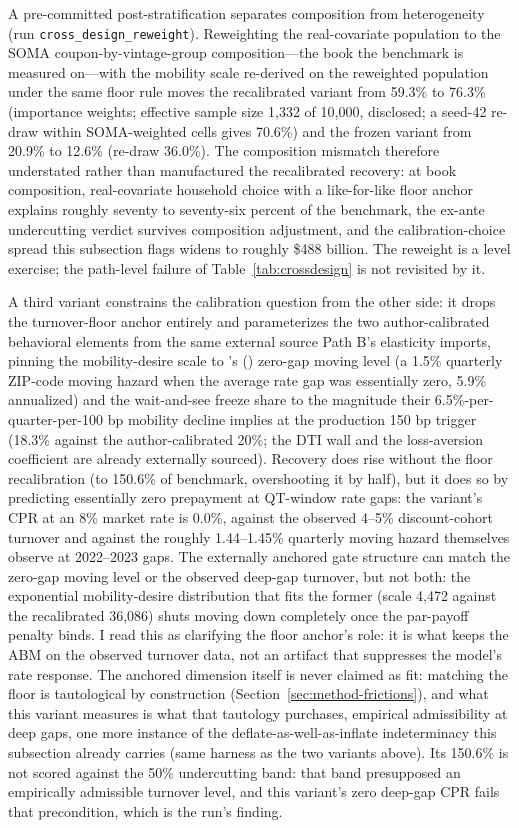 \documentclass[12pt]{article}
\newcommand{\citepos}[1]{\citeauthor{#1}'s (\citeyear{#1})}
\begin{document}
A pre-committed post-stratification separates composition from heterogeneity (run \texttt{cross\_design\_reweight}). Reweighting the real-covariate population to the SOMA coupon-by-vintage-group composition---the book the benchmark is measured on---with the mobility scale re-derived on the reweighted population under the same floor rule moves the recalibrated variant from 59.3\% to 76.3\% (importance weights; effective sample size 1{,}332 of 10{,}000, disclosed; a seed-42 re-draw within SOMA-weighted cells gives 70.6\%) and the frozen variant from 20.9\% to 12.6\% (re-draw 36.0\%). The composition mismatch therefore understated rather than manufactured the recalibrated recovery: at book composition, real-covariate household choice with a like-for-like floor anchor explains roughly seventy to seventy-six percent of the benchmark, the ex-ante undercutting verdict survives composition adjustment, and the calibration-choice spread this subsection flags widens to roughly \$488 billion. The reweight is a level exercise; the path-level failure of Table~\ref{tab:crossdesign} is not revisited by it.

A third variant constrains the calibration question from the other side: it drops the turnover-floor anchor entirely and parameterizes the two author-calibrated behavioral elements from the same external source Path B's elasticity imports, pinning the mobility-desire scale to \citepos{liebersohn2024} zero-gap moving level (a 1.5\% quarterly ZIP-code moving hazard when the average rate gap was essentially zero, 5.9\% annualized) and the wait-and-see freeze share to the magnitude their 6.5\%-per-quarter-per-100 bp mobility decline implies at the production 150 bp trigger (18.3\% against the author-calibrated 20\%; the DTI wall and the loss-aversion coefficient are already externally sourced). Recovery does rise without the floor recalibration (to 150.6\% of benchmark, overshooting it by half), but it does so by predicting essentially zero prepayment at QT-window rate gaps: the variant's CPR at an 8\% market rate is 0.0\%, against the observed 4--5\% discount-cohort turnover and against the roughly 1.44--1.45\% quarterly moving hazard \citet{liebersohn2024} themselves observe at 2022--2023 gaps. The externally anchored gate structure can match the zero-gap moving level or the observed deep-gap turnover, but not both: the exponential mobility-desire distribution that fits the former (scale 4{,}472 against the recalibrated 36{,}086) shuts moving down completely once the par-payoff penalty binds. I read this as clarifying the floor anchor's role: it is what keeps the ABM on the observed turnover data, not an artifact that suppresses the model's rate response. The anchored dimension itself is never claimed as fit: matching the floor is tautological by construction (Section~\ref{sec:method-frictions}), and what this variant measures is what that tautology purchases, empirical admissibility at deep gaps, one more instance of the deflate-as-well-as-inflate indeterminacy this subsection already carries (same harness as the two variants above). Its 150.6\% is not scored against the 50\% undercutting band: that band presupposed an empirically admissible turnover level, and this variant's zero deep-gap CPR fails that precondition, which is the run's finding.
\end{document}
